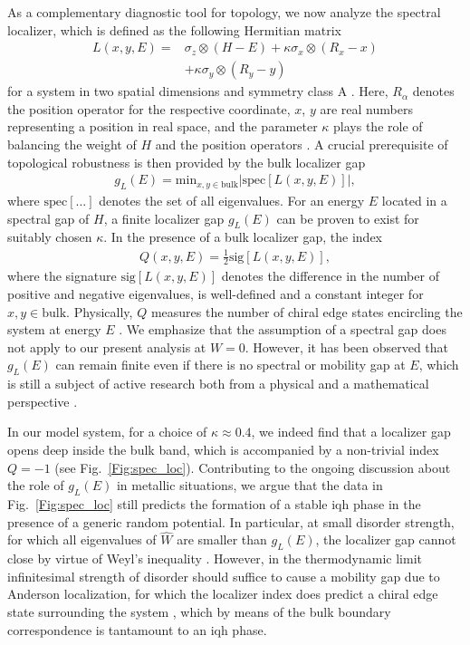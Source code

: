 \documentclass[aps,prb,amsmath,amssymb,twocolumn, superscriptaddress]{revtex4-2}
\begin{document}
As a complementary diagnostic tool for topology, we now analyze the spectral localizer, which is defined as the following Hermitian matrix
\begin{align}
L(x,y,E) =&  \sigma_z \otimes (H - E) + \kappa \sigma_x \otimes (R_x - x) \nonumber \\
&+ \kappa \sigma_y \otimes (R_y - y)
\end{align}
for a system in two spatial dimensions and symmetry class A \cite{Budich2013, Symmetry_classes}. Here, $R_\alpha$ denotes the position operator for the respective coordinate, $x$, $y$ are real numbers representing a position in real space, and the parameter $\kappa$ plays the role of balancing the weight of $H$ and the position operators \cite{Spec_loc_1, Spec_loc_2, Spec_loc_3, Spec_loc_4, Spec_loc_5}. A crucial prerequisite of topological robustness is then provided by the bulk localizer gap
\begin{align}
g_{L}(E) = \text{min}_{x,y \in \text{bulk}} \left| \text{spec}[L(x,y, E)]\right|, \label{Eqn:loc_gap}
\end{align}
where $\text{spec}[...]$ denotes the set of all eigenvalues. For an energy $E$ located in a spectral gap of $H$, a finite localizer gap $g_{L}(E)$ can be proven to exist for suitably chosen $\kappa$. In the presence of a bulk localizer gap, the index 
\begin{align}
Q(x,y, E) = \frac{1}{2} \text{sig}[L(x,y, E)], \label{Eqn:loc_index}
\end{align}
where the signature $\text{sig}[L(x,y, E)]$ denotes the difference in the number of positive and negative eigenvalues, is well-defined and a constant integer for $x,y \in \text{bulk}$. Physically, $Q$ measures the number of chiral edge states encircling the system at energy $E$ \cite{Spec_loc_1, Spec_loc_2, Spec_loc_3, Spec_loc_4, Spec_loc_5}.
We emphasize that the assumption of a spectral gap does not apply to our present analysis at $W=0$. However, it has been observed that $g_{L}(E)$ can remain finite even if there is no spectral or mobility gap at $E$, which is still a subject of active research both from a physical and a mathematical perspective \cite{Fine_structure, Spec_loc_4}.

In our model system, for a choice of $\kappa \approx 0.4$, we indeed find that a localizer gap opens deep inside the bulk band, which is accompanied by a non-trivial index $Q = -1$ (see Fig.~\ref{Fig:spec_loc}). Contributing to the ongoing discussion about the role of $g_{L}(E)$ in metallic situations, we argue that the data in Fig.~\ref{Fig:spec_loc} still predicts the formation of a stable \gls{iqh} phase in the presence of a generic random potential. In particular, at small disorder strength, for which all eigenvalues of $\hat W$ are smaller than $g_{L}(E)$, the localizer gap cannot close by virtue of Weyl's inequality \cite{Fine_structure, Spec_loc_5,Supplemental}. However, in the thermodynamic limit infinitesimal strength of disorder should suffice to cause a mobility gap due to Anderson localization, for which the localizer index does predict a chiral edge state surrounding the system \cite{spec_loc_mobility_gap}, which by means of the bulk boundary correspondence is tantamount to an \gls{iqh} phase.
\end{document}
